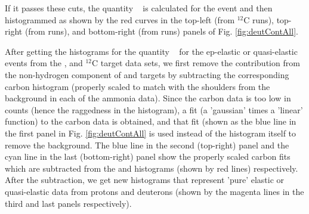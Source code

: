 If it passes these cuts, the quantity \Delt~ is calculated for the event and then histogrammed as shown by the red curves in the top-left (from $^{12}$C runs), top-right (from  runs), and bottom-right (from  runs) panels of Fig. \ref{fig:deutContAll}.


\begin{comment}
\begin{figure}[hbt]
\centerline{\texttt{[image: TechNotes/Figures/deutContamPlot.eps]}}
\caption[Enter caption here for the lists]{Enter caption here}
\label{fig:deutCont}
\end{figure}
\end{comment}

After getting the histograms for the quantity \Delt~ for the ep-elastic or %
quasi-elastic events from the ,  and $^{12}$C target data sets, we first remove the contribution from the non-hydrogen component of  and  targets by subtracting the corresponding carbon histogram (properly scaled to match with the shoulders from the background in each of the ammonia data). Since the carbon data is too low in counts (hence the raggedness in the histogram), %
a fit (a 'gaussian' times a 'linear' function) to the carbon data is obtained, and that fit (shown as the blue line in the first panel in Fig. \ref{fig:deutContAll} is used instead of the histogram itself to remove the background. The blue line in the second (top-right) panel and the cyan  line in the last (bottom-right) panel show the properly scaled carbon fits which are subtracted from the  and  histograms (shown by red lines) respectively. After the subtraction, we get new histograms that represent 'pure' elastic or quasi-elastic data from protons and deuterons (shown by the magenta lines in the third and last panels respectively).


